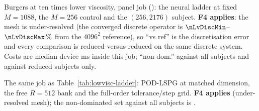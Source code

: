 \begin{table}[h]
\centering
\caption{Burgers at ten times lower viscosity, panel job \provLvPanelJob{}
(\provLvGpu): the neural ladder at fixed $M=1088$, the $M=256$ control and
the $(256, 2176)$ subject. \textbf{F4 applies}: the mesh is under-resolved
(the converged discrete operator is $\nLvDiscMin$--$\nLvDiscMax\,\%$ from the
$4096^2$ reference), so ``vs ref'' is the discretisation error and every
comparison is reduced-versus-reduced on the same discrete system. Costs are
median device ms inside this job; ``non-dom.'' against all subjects and
against reduced subjects only.}
\label{tab:lowvisc-ladder}
\resizebox{\linewidth}{!}{}
\end{table}

\begin{table}[h]
\centering
\caption{The same job as Table~\ref{tab:lowvisc-ladder}: POD-LSPG at matched
dimension, the free $R=512$ bank and the full-order tolerance/step grid.
\textbf{F4 applies} (under-resolved mesh); the non-dominated set against
all subjects is \nLvNonDomList.}
\label{tab:lowvisc-panel}
\resizebox{\linewidth}{!}{}
\end{table}
